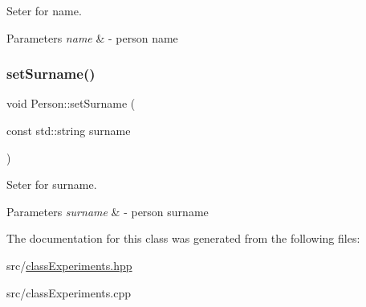 Seter for name. 


\begin{DoxyParams}{Parameters}
{\em name} & -\/ person name \\
\hline
\end{DoxyParams}
\mbox{\label{classPerson_a996855e4e2b077b4b14aa217260e099c}} 
\subsubsection{\texorpdfstring{set\+Surname()}{setSurname()}}
{\footnotesize\ttfamily void Person\+::set\+Surname (\begin{DoxyParamCaption}\item[{const std\+::string}]{surname }\end{DoxyParamCaption})}



Seter for surname. 


\begin{DoxyParams}{Parameters}
{\em surname} & -\/ person surname \\
\hline
\end{DoxyParams}


The documentation for this class was generated from the following files\+:\begin{DoxyCompactItemize}
\item 
src/\hyperlink{classExperiments_8hpp}{class\+Experiments.\+hpp}\item 
src/class\+Experiments.\+cpp\end{DoxyCompactItemize}
